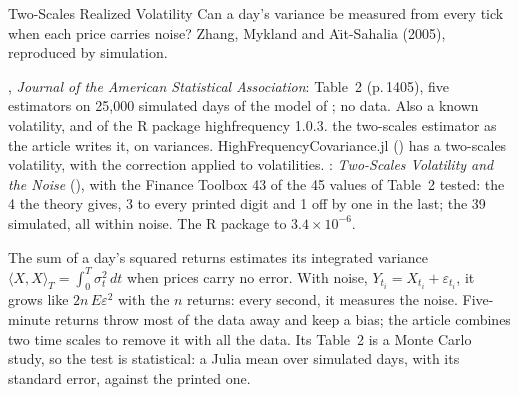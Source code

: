 
\renewcommand{\nmdate}{11 November 2026}



  {Two-Scales Realized Volatility}
  {Can a day's variance be measured from every tick when each price carries noise? Zhang, Mykland and A\"{\i}t-Sahalia
   (2005), reproduced by simulation.}

\factsheet
  {, \emph{Journal of the American Statistical Association}:
   Table~2 (p.\,1405), five estimators on 25,000 simulated days of the model of ; no
   data. Also a known volatility, and  of the R package highfrequency 1.0.3.}
  {the two-scales estimator as the article writes it, on variances. HighFrequencyCovariance.jl
   () has a two-scales volatility, with the correction applied to volatilities.}
  {: \emph{Two-Scales Volatility
   and the Noise} (), with the Finance Toolbox}
  {43 of the 45 values of Table~2 tested: the 4 the theory gives, 3 to every printed digit and 1 off by one in the last;
   the 39 simulated, all within noise. The R package to $3.4\times10^{-6}$.}

The sum of a day's squared returns estimates its integrated variance $\langle X,X\rangle_T=\int_0^T\sigma_t^2\,dt$
when prices carry no error. With noise, $Y_{t_i}=X_{t_i}+\varepsilon_{t_i}$, it grows like $2n\,E\varepsilon^2$ with
the $n$ returns: every second, it measures the noise. Five-minute returns throw most of the data away and keep a bias;
the article combines two time scales to remove it with all the data. Its Table~2 is a Monte Carlo study, so the test is
statistical: a Julia mean over simulated days, with its standard error, against the printed one.

